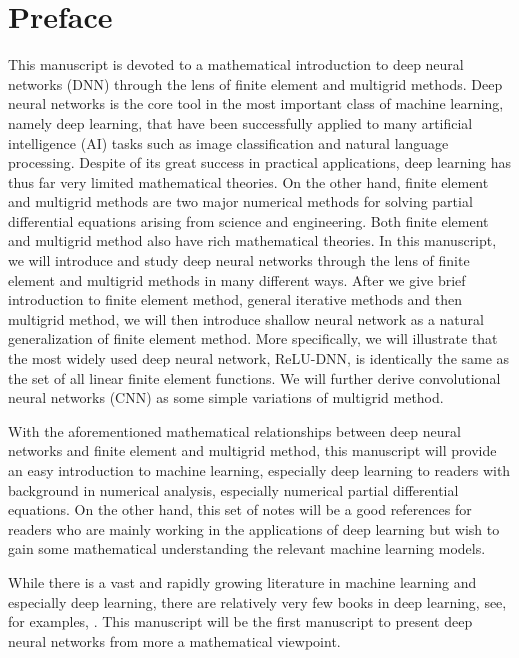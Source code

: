 \chapter{Preface}
This manuscript is devoted to a mathematical introduction to deep
neural networks (DNN) through the lens of finite element and multigrid
methods.  Deep neural networks is the core tool in the most important class of
machine learning, namely deep learning, that have been successfully
applied to many artificial intelligence (AI) tasks such as image
classification and natural language processing.  Despite of its great
success in practical applications, deep learning has thus far very
limited mathematical theories.
%
On the other hand, finite element and multigrid methods are two major
numerical methods for solving partial differential equations arising
from science and engineering.  Both finite element and multigrid
method also have rich mathematical theories.
%
In this manuscript, we will introduce and study deep neural networks
through the lens of finite element and multigrid methods in many
different ways.  After we give brief introduction to finite element
method, general iterative methods and then multigrid method, we will
then introduce shallow neural network as a natural generalization of
finite element method.  More specifically, we will illustrate that the
most widely used deep neural network, ReLU-DNN, is identically the
same as the set of all linear finite element functions.  We will
further derive convolutional neural networks (CNN) as some simple
variations of multigrid method.

With the aforementioned mathematical relationships between deep neural
networks and finite element and multigrid method, this manuscript will
provide an easy introduction to machine learning, especially deep
learning to readers with background in numerical analysis, especially
numerical partial differential equations.  On the other hand, this
set of notes will be a good references for readers who are mainly working in
the applications of deep learning but wish to gain some mathematical
understanding the relevant machine learning models.

While there is a vast and rapidly growing literature in machine
learning and especially deep learning, there are relatively very few
books in deep learning, see, for examples,
\cite{goodfellow2016deep,deng2014deep,nielsen2015neural}.
This manuscript will be the first manuscript to present deep neural networks
from more a mathematical viewpoint.  

